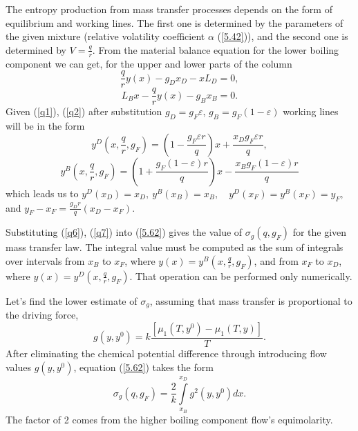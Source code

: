 \documentclass[12pt]{article}
\begin{document}
The entropy production from mass transfer processes depends on the form of equilibrium and working lines. The first one is determined by the parameters of the given mixture (relative volatility coefficient $\alpha$ (\ref{5.42})), and the second one is determined by $V=\frac{q}{r}$. From the material balance equation for the lower boiling component we can get, for the upper and lower parts of the column
\begin{equation}
\frac{q}{r}y(x)- g_{D} x_{D} - x L_{D} =0,
\label{q4}
\end{equation}
\begin{equation}
L_{B} x - \frac{q}{r}y (x)- g_{B} x_{B} =0.
\label{q5}
\end{equation}
Given (\ref{q1}), (\ref{q2}) after substitution $g_D=g_F\varepsilon$, $g_B=g_F(1-\varepsilon)$ working lines will be in the form
\begin{equation}
y^{D} (x, \frac{q}{r}, g_F)= \left( 1- \frac{g_F\varepsilon r}{q} \right) x + \frac{x_{D}
g_F\varepsilon r}{q},
\label{q6}
\end{equation}
\begin{equation}
y^{B} (x, \frac{q}{r}, g_{F})= \left( 1+ \frac{g_F(1-\varepsilon)r}{q} \right) x - \frac{x_{B}
g_F(1-\varepsilon)r}{q}
\label{q7}
\end{equation}
which leads us to $y^{D}(x_D)=x_D,~y^{B}(x_B)=x_B,\quad y^{D}(x_F)= y^{B}(x_F)=y_F$, and $y_F-x_F=\frac{g_D r}{q}(x_D-x_F)$.

Substituting (\ref{q6}), (\ref{q7}) into (\ref{5.62}) gives the value of $\sigma_g (q, g_{F})$ for the given mass transfer law. The integral value must be computed as the sum of integrals over intervals from $x_{B}$ to $x_{F}$, where $y(x)=
y^{B} (x, \frac{q}{r},g_F)$, and from $x_{F}$ to $x_{D}$, where $y(x)= y^{D} (x, \frac{q}{r},g_F)$. That operation can be performed only numerically.

Let's find the lower estimate of $\sigma_g$, assuming that mass transfer  is proportional to the driving force,
\begin{equation}
g(y, y^0)= k\frac{[ \mu_1(T, y^0)-\mu_1(T, y)]}{T}.
	\label{r8}
\end{equation}
After eliminating the chemical potential difference through introducing flow values $g(y, y^0)$, equation (\ref{5.62}) takes the form
\begin{equation}
\sigma_g (q,g_F)=\frac{2}{k}\int\limits^{x_D}_{x_B} g^2(y, y^0)dx .
	\label{r4}
\end{equation}
The factor of 2 comes from the higher boiling component flow's equimolarity.
\end{document}
